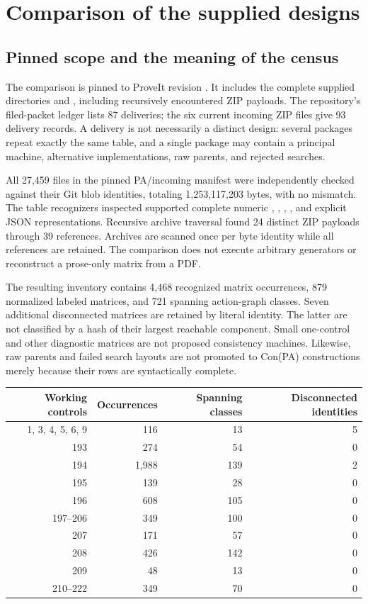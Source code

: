 \section{Comparison of the supplied designs}
\label{sec:comparison}

\subsection{Pinned scope and the meaning of the census}

The comparison is pinned to ProveIt revision
.
It includes the complete supplied directories
 and ,
including recursively encountered ZIP payloads. The repository's filed-packet
ledger lists 87 deliveries; the six current incoming ZIP files give 93 delivery
records. A delivery is not necessarily a distinct design: several packages
repeat exactly the same table, and a single package may contain a principal
machine, alternative implementations, raw parents, and rejected searches.

All 27,459 files in the pinned PA/incoming manifest were independently checked
against their Git blob identities, totaling 1,253,117,203 bytes, with no
mismatch. The table recognizers inspected supported complete numeric
, , , , and explicit JSON
representations. Recursive archive traversal found 24 distinct ZIP payloads
through 39 references. Archives are scanned once per byte identity while all
references are retained. The comparison does not execute arbitrary generators
or reconstruct a prose-only matrix from a PDF.

The resulting inventory contains 4,468 recognized matrix occurrences, 879
normalized labeled matrices, and 721 spanning action-graph classes. Seven
additional disconnected matrices are retained by literal identity. The latter
are not classified by a hash of their largest reachable component. Small
one-control and other diagnostic matrices are not proposed consistency
machines. Likewise, raw parents and failed search layouts are not promoted to
Con(PA) constructions merely because their rows are syntactically complete.

\begin{center}
\begin{tabular}{@{}rrrr@{}}
\toprule
Working controls & Occurrences & Spanning classes & Disconnected identities\\
\midrule
1, 3, 4, 5, 6, 9 & 116 & 13 & 5\\
193 & 274 & 54 & 0\\
194 & 1,988 & 139 & 2\\
195 & 139 & 28 & 0\\
196 & 608 & 105 & 0\\
197--206 & 349 & 100 & 0\\
207 & 171 & 57 & 0\\
208 & 426 & 142 & 0\\
209 & 48 & 13 & 0\\
210--222 & 349 & 70 & 0\\
\bottomrule
\end{tabular}
\end{center}

